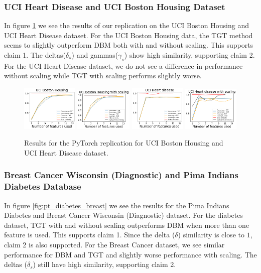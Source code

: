 \subsubsection{UCI Heart Disease and UCI Boston Housing Dataset}
In figure \ref{fig:pt_heart_housing} we see the results of our replication on the UCI Boston Housing and UCI Heart Disease dataset. For the UCI Boston Housing data, the TGT method seems to slightly outperform DBM both with and without scaling. This supports claim 1. The deltas($\delta_s$) and gammas($\gamma_s$) show high similarity, supporting claim 2. For the UCI Heart Disease dataset, we do not see a difference in performance without scaling while TGT with scaling performs slightly worse.
\begin{figure}[H]
    \includegraphics[width=0.24\textwidth]{images/ptfigures/housing-tradeoff.png}
    \includegraphics[width=0.244\textwidth]{images/ptfigures/housing-scaling-tradeoff.png}
    \includegraphics[width=0.24\textwidth]{images/ptfigures/heart-tradeoff.png}
    \includegraphics[width=0.24\textwidth]{images/ptfigures/heartscaling-tradeoff.png}
    \caption{Results for the PyTorch replication for UCI Boston Housing and UCI Heart Disease dataset.}
    \label{fig:pt_heart_housing}
\end{figure}

\subsubsection{Breast Cancer Wisconsin (Diagnostic) and Pima Indians Diabetes Database}
In figure \ref{fig:pt_diabetes_breast} we see the results for the Pima Indians Diabetes and Breast Cancer Wisconsin (Diagnostic) dataset. For the diabetes dataset, TGT with and without scaling outperforms DBM when more than one feature is used. This supports claim 1. Since the delta ($\delta$) similarity is close to $1$, claim 2 is also supported. For the Breast Cancer dataset, we see similar performance for DBM and TGT and slightly worse performance with scaling. The deltas ($\delta_s$) still have high similarity, supporting claim 2. 

